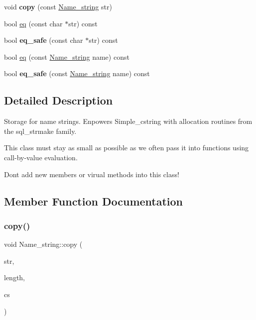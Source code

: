 \begin{DoxyCompactItemize}
void {\bfseries copy} (const \mbox{\hyperlink{className__string}{Name\+\_\+string}} str)
\item 
bool \mbox{\hyperlink{className__string_a99fc935131dae337de98c11e36c6c3dd}{eq}} (const char $\ast$str) const
\item 
\mbox{\label{className__string_a78c8a57d7e04bf9d099feeda251c89a1}} 
bool {\bfseries eq\+\_\+safe} (const char $\ast$str) const
\item 
bool \mbox{\hyperlink{className__string_ae359df5c3df3e956a9fe215e1aa9eba9}{eq}} (const \mbox{\hyperlink{className__string}{Name\+\_\+string}} name) const
\item 
\mbox{\label{className__string_a6e98e7fb2535d6ce412a8c1facf92c19}} 
bool {\bfseries eq\+\_\+safe} (const \mbox{\hyperlink{className__string}{Name\+\_\+string}} name) const
\end{DoxyCompactItemize}


\subsection{Detailed Description}
Storage for name strings. Enpowers Simple\+\_\+cstring with allocation routines from the sql\+\_\+strmake family.

This class must stay as small as possible as we often pass it into functions using call-\/by-\/value evaluation.

Don\textquotesingle{}t add new members or virual methods into this class! 

\subsection{Member Function Documentation}
\mbox{\label{className__string_ad2f16ca58a7fd5438005f065d6daf345}} 
\subsubsection{\texorpdfstring{copy()}{copy()}\hspace{0.1cm}{\footnotesize\ttfamily [1/2]}}
{\footnotesize\ttfamily void Name\+\_\+string\+::copy (\begin{DoxyParamCaption}\item[{const char $\ast$}]{str,  }\item[{size\+\_\+t}]{length,  }\item[{const C\+H\+A\+R\+S\+E\+T\+\_\+\+I\+N\+FO $\ast$}]{cs }\end{DoxyParamCaption})}

